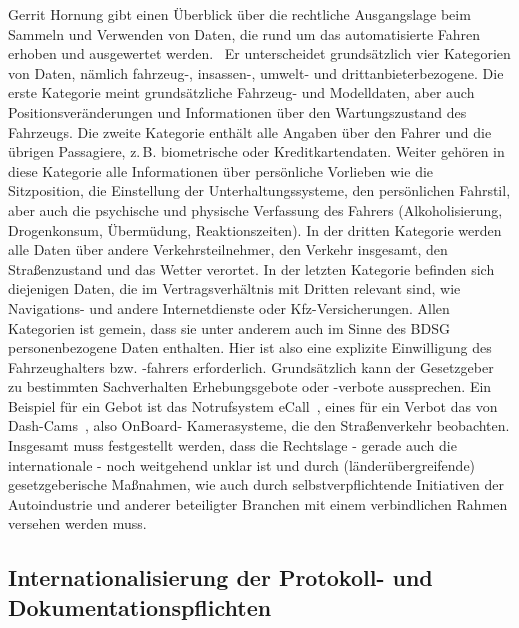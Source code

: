 \documentclass[twoside,a4paper,12pt]{article}
\begin{document}
Gerrit Hornung gibt einen Überblick über die rechtliche Ausgangslage beim Sammeln und Verwenden von Daten, die rund um das automatisierte Fahren
erhoben und ausgewertet werden.~\cite{ho} Er unterscheidet grundsätzlich vier Kategorien von Daten, nämlich fahrzeug-, insassen-, umwelt- und 
drittanbieterbezogene. Die erste Kategorie meint grundsätzliche Fahrzeug- und Modelldaten, aber auch Positionsveränderungen und Informationen über den
Wartungszustand des Fahrzeugs. Die zweite Kategorie enthält alle Angaben über den Fahrer und die übrigen Passagiere, z.\,B. biometrische oder Kreditkartendaten.
Weiter gehören in diese Kategorie alle Informationen über persönliche Vorlieben wie die Sitzposition, die Einstellung der Unterhaltungssysteme, den
persönlichen Fahrstil, aber auch die psychische und physische Verfassung des Fahrers (Alkoholisierung, Drogenkonsum, Übermüdung, Reaktionszeiten).
In der dritten Kategorie werden alle Daten über andere Verkehrsteilnehmer, den Verkehr insgesamt, den Straßenzustand und das Wetter verortet.
In der letzten Kategorie befinden sich diejenigen Daten, die im Vertragsverhältnis mit Dritten relevant sind, wie Navigations- und andere Internetdienste oder
Kfz-Versicherungen.
Allen Kategorien ist gemein, dass sie unter anderem auch im Sinne des BDSG personenbezogene Daten enthalten. Hier ist also eine explizite Einwilligung
des Fahrzeughalters bzw. -fahrers erforderlich. Grundsätzlich kann der Gesetzgeber zu bestimmten Sachverhalten Erhebungsgebote oder -verbote aussprechen.
Ein Beispiel für ein Gebot ist das Notrufsystem eCall\mbox{~\cite[S. 362]{ho}}, eines für ein Verbot das von Dash-Cams\mbox{~\cite[S. 363]{ho}}, also OnBoard-
Kamerasysteme, die den Straßenverkehr beobachten. Insgesamt muss festgestellt werden, dass die Rechtslage - gerade auch die internationale - noch weitgehend 
unklar ist und durch (länderübergreifende) gesetzgeberische Maßnahmen, wie auch durch selbstverpflichtende Initiativen der Autoindustrie und anderer beteiligter 
Branchen mit einem verbindlichen Rahmen versehen werden muss.

\subsection{Internationalisierung der Protokoll- und Dokumentationspflichten} \label{InternationaleStandardisierungDerProtokollUndDokumentationspflichten}
\end{document}
